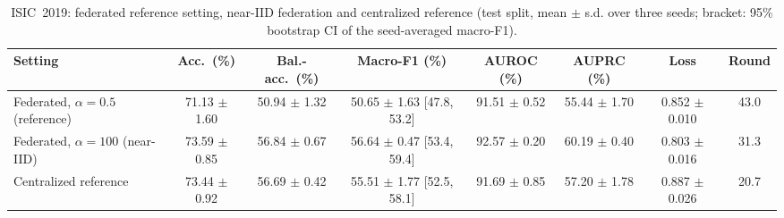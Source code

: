 \begin{table}[!t]
\caption{ISIC~2019: federated reference setting, near-IID federation and centralized reference (test split, mean $\pm$ s.d. over three seeds; bracket: 95\% bootstrap CI of the seed-averaged macro-F1).}
\label{tab:19-main}
\centering
\footnotesize
\begin{tabular}{lccccccc}
\toprule
Setting & Acc.\ (\%) & Bal.-acc.\ (\%) & Macro-F1 (\%) & AUROC (\%) & AUPRC (\%) & Loss & Round \\
\midrule
Federated, $\alpha{=}0.5$ (reference) & 71.13 $\pm$ 1.60 & 50.94 $\pm$ 1.32 & 50.65 $\pm$ 1.63 [47.8, 53.2] & 91.51 $\pm$ 0.52 & 55.44 $\pm$ 1.70 & 0.852 $\pm$ 0.010 & 43.0 \\
Federated, $\alpha{=}100$ (near-IID) & 73.59 $\pm$ 0.85 & 56.84 $\pm$ 0.67 & 56.64 $\pm$ 0.47 [53.4, 59.4] & 92.57 $\pm$ 0.20 & 60.19 $\pm$ 0.40 & 0.803 $\pm$ 0.016 & 31.3 \\
Centralized reference & 73.44 $\pm$ 0.92 & 56.69 $\pm$ 0.42 & 55.51 $\pm$ 1.77 [52.5, 58.1] & 91.69 $\pm$ 0.85 & 57.20 $\pm$ 1.78 & 0.887 $\pm$ 0.026 & 20.7 \\
\bottomrule
\end{tabular}
\end{table}